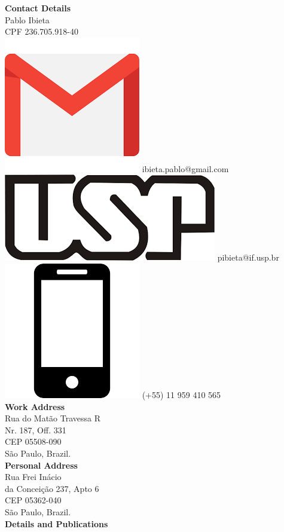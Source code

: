 \documentclass[a4paper,12pt,final]{memoir}
\begin{document}
\begin{flushleft}\small
    \vspace{10mm}
    \textbf{Contact Details}\\
    \vspace{1mm}
	Pablo Ibieta\\
	\vspace{1mm}
	CPF 236.705.918-40 \\
	\vspace{1mm}
    \includegraphics[width=0.07\columnwidth]{gmail_icon.png} ibieta.pablo@gmail.com \\
    \vspace{1mm}
    \includegraphics[width=0.08\columnwidth]{usp_icon.png} pibieta@if.usp.br \\
    \includegraphics[width=0.07\columnwidth]{cellphone_icon.png} (+55) 11 959 410 565 \\	
	\vspace{4mm}
	\textbf{Work Address}\\
	\vspace{1mm}
	Rua do Mat\~ao Travessa R\\
	\vspace{1mm}
	Nr. 187, Off. 331 \\
	\vspace{1mm}
	CEP 05508-090\\
	\vspace{1mm}
	S\~{a}o Paulo, Brazil.\\
	\vspace{4mm}
	\textbf{Personal Address}\\
	\vspace{1mm}
	Rua Frei In\'{a}cio \\
	\vspace{1mm}
	da Concei\c{c}\~{a}o 237, Apto 6 \\
	\vspace{1mm}
	CEP 05362-040 \\
	\vspace{1mm}
	S\~{a}o Paulo, Brazil.\\
	\vspace{4mm}
	\textbf{Details and Publications}\\

\end{flushleft}
\end{document}
